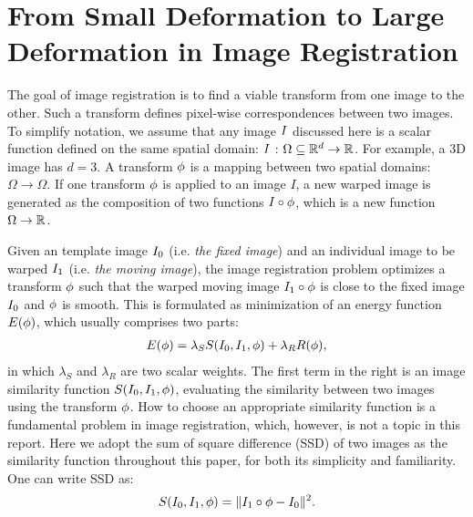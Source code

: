 \documentclass[letterpaper,12pt]{article}
\begin{document}
\section{From Small Deformation to Large Deformation in Image Registration}

The goal of image registration is to find a viable transform from one image to the other. Such a transform defines pixel-wise correspondences between two images. 
To simplify notation, we assume that any image $I$ discussed here is a scalar function defined on the same spatial domain: $I$ : $\Omega \subseteq \mathbb{R}^d \to \mathbb{R}$. 
For example, a 3D image has $d=3$. A transform $\phi$ is a mapping between two spatial domains: $\Omega \rightarrow \Omega$. 
If one transform $\phi$ is applied to an image $I$, a new warped
image is generated as the composition of two functions $I \circ
\phi$, which is a new function $\Omega \to \mathbb{R}$. 

Given an template image $I_0$ (i.e. \textit{the fixed image}) and an
individual image to be warped $I_1$ (i.e. \textit{the moving image}),
the image registration problem optimizes a transform $\phi$ such
that the warped moving image $I_1 \circ \phi$ is close to the fixed image $I_0$ and $\phi$ is smooth. 
This is formulated as minimization of an energy function
$E(\phi)$, which usually comprises two parts:
\begin{align}
\label{eq:energy}
E(\phi) = \lambda_S S(I_0,I_1,\phi) + \lambda_R R(\phi),
\end{align}
in which $\lambda_S$ and $\lambda_R$ are two scalar weights. The first term in the right is an image similarity function $S(I_0, I_1, \phi)$, evaluating the similarity between two images using the transform $\phi$. 
How to choose an appropriate similarity function is a fundamental problem in image registration, which, however, is not a topic in this report. 
Here we adopt the sum of square difference (SSD) of two images as the
similarity function throughout this paper, for both its simplicity and
familiarity. One can write SSD as:
\begin{align}
S(I_0, I_1, \phi) = \| I_1 \circ \phi - I_0 \|^2.
\label{eq:SSD}
\end{align}
\end{document}
